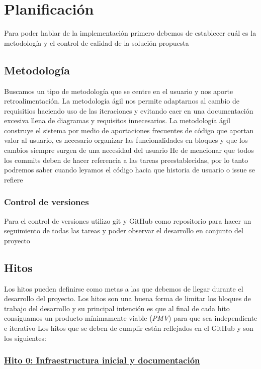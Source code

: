 \chapter{Planificación}

Para poder hablar de la implementación primero debemos de establecer cuál es la metodología y el control de calidad 
de la solución propuesta

\section{Metodología}

Buscamos un tipo de metodología que se centre en el usuario y nos aporte retroalimentación.
La metodología ágil nos permite adaptarnos al cambio de requisitios haciendo uso de las iteraciones y 
evitando caer en una documentación excesiva llena de diagramas y requisitos innecesarios.
La metodología ágil construye el sistema por medio de aportaciones frecuentes de código que aportan valor 
al usuario, es necesario organizar las funcionalidades en bloques y que los cambios siempre surgen de una 
necesidad del usuario
He de mencionar que todos los commits deben de hacer referencia a las tareas preestablecidas, por lo tanto 
podremos saber cuando leyamos el código hacia que historia de usuario o issue se refiere

\subsection{Control de versiones}
Para el control de versiones utilizo git y GitHub como repositorio para hacer un seguimiento de todas las tareas
y poder observar el desarrollo en conjunto del proyecto 

\section{Hitos}
Los hitos pueden definirse como metas a las que debemos de llegar durante el desarrollo del proyecto.
Los hitos son una buena forma de limitar los bloques de trabajo del desarrollo y su principal intención es que 
al final de cada hito consiguamos un producto mínimamente viable (\textit{PMV}) para que sea independiente e iterativo 
Los hitos que se deben de cumplir están reflejados en el GitHub y son los siguientes: 
\subsection*{\href{https://github.com/RubenDelgadoPareja/TFG-Triage-Inteligente-Consulta-Medica/milestone/1}{Hito 0: Infraestructura inicial y documentación}}

